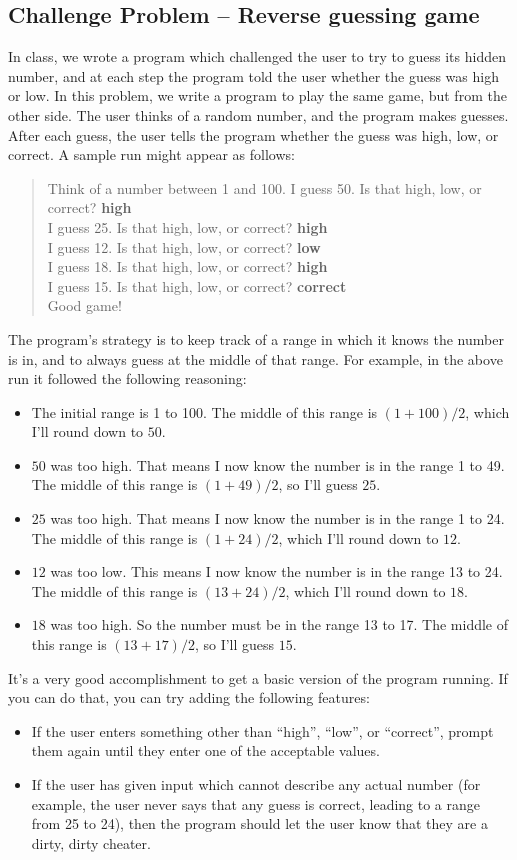 \documentclass[11pt]{article}
\theoremstyle{plain}
\theoremstyle{definition}
\theoremstyle{remark}
\begin{document}
\subsection*{Challenge Problem -- Reverse guessing game}
In class, we wrote a program which challenged the user to try to guess its
hidden number, and at each step the program told the user whether the guess was
high or low. In this problem, we write a program to play the same game, but from
the other side. The user thinks of a random number, and the program makes
guesses. After each guess, the user tells the program whether the guess was
high, low, or correct. A sample run might appear as follows:
\begin{quote}
  Think of a number between 1 and 100.
  I guess 50. Is that high, low, or correct? \textbf{high} \\
  I guess 25. Is that high, low, or correct? \textbf{high} \\
  I guess 12. Is that high, low, or correct? \textbf{low} \\
  I guess 18. Is that high, low, or correct? \textbf{high} \\
  I guess 15. Is that high, low, or correct? \textbf{correct} \\
  Good game!
\end{quote}
The program's strategy is to keep track of a range in which it knows the number
is in, and to always guess at the middle of that range. For example, in the
above run it followed the following reasoning:
\begin{itemize}
  \item The initial range is 1 to 100. The middle of this range is $(1 + 100) /
    2$, which I'll round down to $50$.
  \item $50$ was too high. That means I now know the number is in the range 1 to
    49. The middle of this range is $(1 + 49) / 2$, so I'll guess $25$.
  \item $25$ was too high. That means I now know the number is in the range 1 to
    24. The middle of this range is $(1 + 24) / 2$, which I'll round down to
    $12$.
  \item $12$ was too low. This means I now know the number is in the range 13 to
    24. The middle of this range is $(13 + 24) / 2$, which I'll round down to
    $18$.
  \item $18$ was too high. So the number must be in the range 13 to 17. The
    middle of this range is $(13 + 17) / 2$, so I'll guess $15$.
\end{itemize}
It's a very good  accomplishment to get a basic version of the program running.
If you can do that, you can try adding the following features:
\begin{itemize}
  \item If the user enters something other than ``high'', ``low'', or
    ``correct'', prompt them again until they enter one of the acceptable
    values.
  \item If the user has given input which cannot describe any actual number (for
    example, the user never says that any guess is correct, leading to a range
    from 25 to 24), then the program should let the user know that they are a
    dirty, dirty cheater.
\end{itemize}
\end{document}
